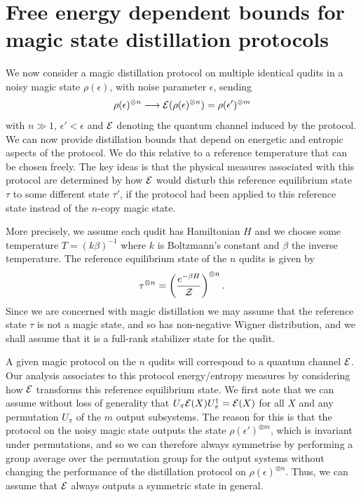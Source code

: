 \documentclass[pra,
aps,
twocolumn,
superscriptaddress,
groupedaddress,
nofootinbib,
reprint
]{revtex4-1}
\begin{document}
\section{Free energy dependent bounds for magic state distillation protocols}
\label{sec:stab}

We now consider a magic distillation protocol on multiple identical qudits in a noisy magic state $\rho(\epsilon)$, with noise parameter $\epsilon$, sending 
\begin{equation}
\rho(\epsilon)^{\otimes n} \longrightarrow \mathcal{E}(\rho(\epsilon)^{\otimes n}) =\rho(\epsilon')^{\otimes m}
\end{equation}
with $n \gg 1$, $\epsilon' <\epsilon$ and $\mathcal{E}$ denoting the quantum channel induced by the protocol. We can now provide distillation bounds that depend on energetic and entropic aspects of the protocol. We do this relative to a reference temperature that can be chosen freely. The key ideas is that the physical measures associated with this protocol are determined by how $\mathcal{E}$ would disturb this reference equilibrium state $\tau$ to some different state $\tau'$, if the protocol had been applied to this reference state instead of the $n$-copy magic state. 

More precisely, we assume each qudit has Hamiltonian $H$ and we choose some temperature $T = (k\beta)^{-1}$ where $k$ is Boltzmann's constant and $\beta$ the inverse temperature. The reference equilibrium state of the $n$ qudits is given by
\begin{equation}
\tau^{\otimes n} = \left ( \frac{e^{-\beta H}}{\mathcal{Z}} \right )  ^{\otimes n}.
\end{equation}
Since we are concerned with magic distillation we may assume that the reference state $\tau$ is not a magic state, and so has non-negative Wigner distribution, and we shall assume that it is a full-rank stabilizer state for the qudit. 

A given magic protocol on the $n$ qudits will correspond to a quantum channel $\mathcal{E}$. Our analysis associates to this protocol energy/entropy measures by considering how $\mathcal{E}$ transforms this reference equilibrium state. We first note that we can assume without loss of generality that $U_\pi\mathcal{E}(X) U_\pi^\dagger = \mathcal{E}(X)$ for all $X$ and any permutation $U_\pi$ of the $m$ output subsystems. The reason for this is that the protocol on the noisy magic state outputs the state $\rho(\epsilon')^{\otimes m}$, which is invariant under permutations, and so we can therefore always symmetrise by performing a group average over the permutation group for the output systems without changing the performance of the distillation protocol on $\rho(\epsilon)^{\otimes n}$. Thus, we can assume that $\mathcal{E}$ always outputs a symmetric state in general.
\end{document}
